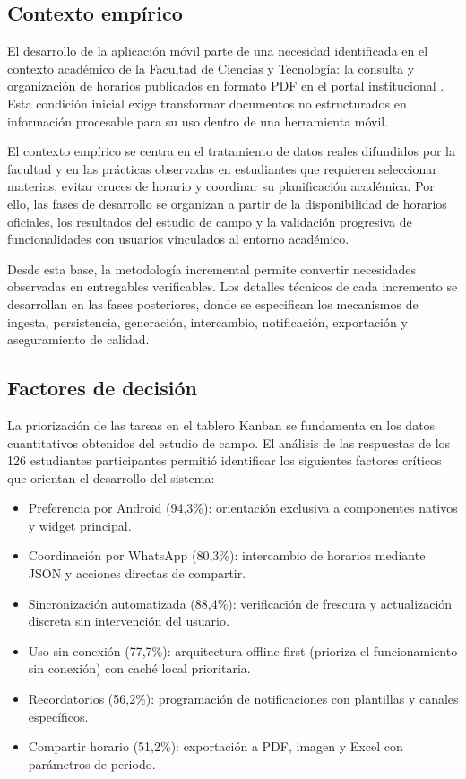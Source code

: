 \subsection{Contexto empírico}
El desarrollo de la aplicación móvil parte de una necesidad identificada en el contexto académico de la Facultad de Ciencias y Tecnología: la consulta y organización de horarios publicados en formato PDF en el portal institucional \cite{horarios_fcyt}. Esta condición inicial exige transformar documentos no estructurados en información procesable para su uso dentro de una herramienta móvil.

El contexto empírico se centra en el tratamiento de datos reales difundidos por la facultad y en las prácticas observadas en estudiantes que requieren seleccionar materias, evitar cruces de horario y coordinar su planificación académica. Por ello, las fases de desarrollo se organizan a partir de la disponibilidad de horarios oficiales, los resultados del estudio de campo y la validación progresiva de funcionalidades con usuarios vinculados al entorno académico.

Desde esta base, la metodología incremental permite convertir necesidades observadas en entregables verificables. Los detalles técnicos de cada incremento se desarrollan en las fases posteriores, donde se especifican los mecanismos de ingesta, persistencia, generación, intercambio, notificación, exportación y aseguramiento de calidad.

\subsection{Factores de decisión}
La priorización de las tareas en el tablero Kanban se fundamenta en los datos cuantitativos obtenidos del estudio de campo. El análisis de las respuestas de los 126 estudiantes participantes \cite{encuesta_fcyt_2025} permitió identificar los siguientes factores críticos que orientan el desarrollo del sistema:
\begin{itemize}
  \item Preferencia por Android (94,3\%): orientación exclusiva a componentes nativos y widget principal.
  \item Coordinación por WhatsApp (80,3\%): intercambio de horarios mediante JSON y acciones directas de compartir.
  \item Sincronización automatizada (88,4\%): verificación de frescura y actualización discreta sin intervención del usuario.
  \item Uso sin conexión (77,7\%): arquitectura offline-first (prioriza el funcionamiento sin conexión) con caché local prioritaria.
  \item Recordatorios (56,2\%): programación de notificaciones con plantillas y canales específicos.
  \item Compartir horario (51,2\%): exportación a PDF, imagen y Excel con parámetros de periodo.
\end{itemize}

